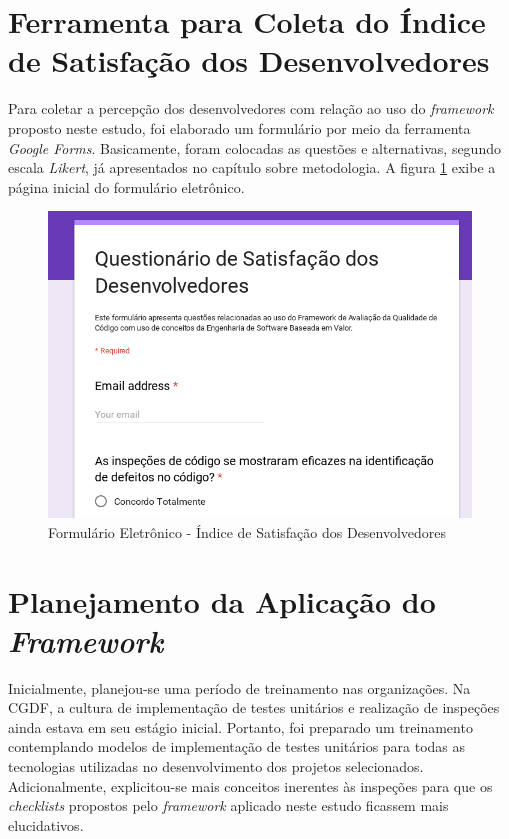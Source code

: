 \section{Ferramenta para Coleta do Índice de Satisfação dos Desenvolvedores}

Para coletar a percepção dos desenvolvedores com relação ao uso do \textit{framework} proposto neste estudo, foi elaborado um formulário por meio da ferramenta \textit{Google Forms}. Basicamente, foram colocadas as questões e alternativas, segundo escala \textit{Likert}, já apresentados no capítulo sobre metodologia. A figura \ref{fig:questionario} exibe a página inicial do formulário eletrônico.

\begin{figure}[h]
\includegraphics[width=\textwidth]{figuras/questionario.png}
\caption{Formulário Eletrônico - Índice de Satisfação dos Desenvolvedores}
\label{fig:questionario}
\end{figure}

\section{Planejamento da Aplicação do \textit{Framework}}

Inicialmente, planejou-se uma período de treinamento nas organizações. Na CGDF, a cultura de implementação de testes unitários e realização de inspeções ainda estava em seu estágio inicial. Portanto, foi preparado um treinamento contemplando modelos de implementação de testes unitários para todas as tecnologias utilizadas no desenvolvimento dos projetos selecionados. Adicionalmente, explicitou-se mais conceitos inerentes às inspeções para que os \textit{checklists} propostos pelo \textit{framework} aplicado neste estudo ficassem mais elucidativos.

